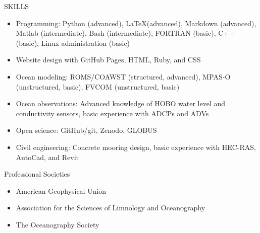 \documentclass{resume} %
\begin{document}
\begin{rSection}{SKILLS}
\begin{itemize}
    \item Programming: Python (advanced), \LaTeX (advanced), Markdown (advanced), Matlab (intermediate), Bash (intermediate), FORTRAN (basic), C$++$ (basic), Linux administration (basic)
    \item Website design with GitHub Pages, HTML, Ruby, and CSS
    \item Ocean modeling: ROMS/COAWST (structured, advanced), MPAS-O (unstructured, basic), FVCOM (unstructured, basic)
    \item Ocean observations: Advanced knowledge of HOBO water level and conductivity sensors, basic experience with ADCPs and ADVs
    \item Open science: GitHub/git, Zenodo, GLOBUS
    \item Civil engineering: Concrete mooring design, basic experience with HEC-RAS, AutoCad, and Revit
\end{itemize}
\end{rSection}

\begin{rSection}{Professional Societies} \itemsep -3pt {}
\begin{itemize}
    \item American Geophysical Union
    \item Association for the Sciences of Limnology and Oceanography
    \item The Oceanography Society 
\end{itemize}
\end{rSection}


\end{document}
